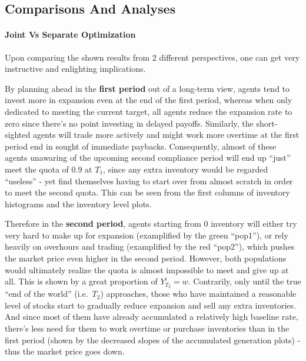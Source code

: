 \documentclass{article}
\begin{document}
{\hypertarget{comparisons-and-analyses}{%
\subsection{Comparisons And
Analyses}\label{comparisons-and-analyses}}

\hypertarget{joint-vs-separate-optimization}{%
\paragraph{Joint Vs Separate
Optimization}\label{joint-vs-separate-optimization}}

Upon comparing the shown results from 2 different perspectives, one can
get very instructive and enlighting implications.

By planning ahead in the \textbf{first period} out of a long-term view,
agents tend to invest more in expansion even at the end of the first
period, whereas when only dedicated to meeting the current target, all
agents reduce the expansion rate to zero since there's no point
investing in delayed payoffs. Similarly, the short-sighted agents will
trade more actively and might work more overtime at the first period end
in sought of immediate paybacks. Consequently, almost of these agents
unawaring of the upcoming second compliance period will end up ``just''
meet the quota of 0.9 at \(T_1\), since any extra inventory would be
regarded ``useless'' - yet find themselves having to start over from
almost scratch in order to meet the second quota. This can be seen from
the first columns of inventory histograms and the inventory level plots.

Therefore in the \textbf{second period}, agents starting from 0
inventory will either try very hard to make up for expansion
(examplified by the green ``pop1''), or rely heavily on overhours and
trading (examplified by the red ``pop2''), which pushes the market price
even higher in the second period. However, both populations would
ultimately realize the quota is almost impossible to meet and give up at
all. This is shown by a great proportion of \(Y_{T_2}^i=w\). Contrarily,
only until the true ``end of the world'' (i.e.~\(T_2\)) approaches,
those who have maintained a reasonable level of stocks start to
gradually reduce expansion and sell any extra inventories. And since
most of them have already accumulated a relatively high baseline rate,
there's less need for them to work overtime or purchase inventories than
in the first period (shown by the decreased slopes of the accumulated
generation plots) - thus the market price goes down.

}
\end{document}
